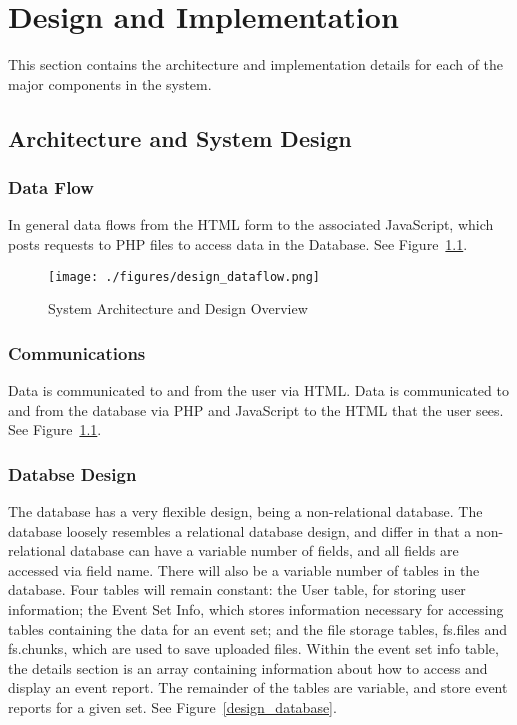 

\chapter{Design  and Implementation}
This section contains the architecture and implementation details for each of the major components in the system.

 \section{Architecture and System Design}
 
 \subsection{Data Flow} 
 In general data flows from the HTML form to the associated JavaScript, which posts requests to PHP files to access data in the Database. See Figure~\ref{design_dataflow}.

\begin{figure}[tbh]
\begin{center}
\texttt{[image: ./figures/design\_dataflow.png]}
\end{center}
\caption{System Architecture and Design Overview\label{design_dataflow}}
\end{figure}
 
 \subsection{Communications} Data is communicated to and from the user via HTML. Data is communicated to and from the database via PHP and JavaScript to the HTML that the user sees. See Figure~\ref{design_dataflow}.
 
 \subsection{Databse Design} The database has a very flexible design, being a non-relational database. The database loosely resembles a relational database design, and differ in that a non-relational database can have a variable number of fields, and all fields are accessed via field name. There will also be a variable number of tables in the database. Four tables will remain constant: the User table, for storing user information; the Event Set Info, which stores information necessary for accessing tables containing the data for an event set; and the file storage tables, fs.files and fs.chunks, which are used to save uploaded files. Within the event set info table, the details section is an array containing information about how to access and display an event report. The remainder of the tables are variable, and store event reports for a given set. See Figure~\ref{design_database}.
 
